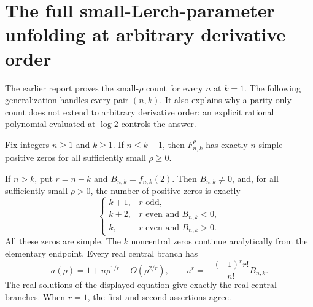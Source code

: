 \section{The full small-Lerch-parameter unfolding at arbitrary derivative order}
\label{unfold:sec:main}

The earlier report \cite{LerchBaseline} proves the small-$\rho$ count for every
$n$ at $k=1$. The following generalization handles every pair $(n,k)$.
It also explains why a parity-only count does not extend to arbitrary
derivative order: an explicit rational polynomial evaluated at $\log2$
controls the answer.

\begin{theorem}
\label{unfold:thm:count}
Fix integers $n\geq1$ and $k\geq1$.
If $n\leq k+1$, then $F_{n,k}^{\rho}$ has exactly $n$ simple
positive zeros for all sufficiently small $\rho\geq0$.

If $n>k$, put $r=n-k$ and $B_{n,k}=f_{n,k}(2)$. Then
$B_{n,k}\ne0$, and, for all sufficiently small $\rho>0$, the
number of positive zeros is exactly
\begin{equation}\label{unfold:eq:counts}
 \begin{cases}
 k+1,&r\text{ odd},\\
 k+2,&r\text{ even and }B_{n,k}<0,\\
 k,&r\text{ even and }B_{n,k}>0.
 \end{cases}
\end{equation}
All these zeros are simple. The $k$ noncentral zeros continue
analytically from the elementary endpoint. Every real central branch
has
\begin{equation}\label{unfold:eq:puiseux}
 a(\rho)=1+u\rho^{1/r}+O(\rho^{2/r}),\qquad
 u^r=-\frac{(-1)^r r!}{n!}B_{n,k}.
\end{equation}
The real solutions of the displayed equation give exactly the real
central branches. When $r=1$, the first and second assertions agree.
\end{theorem}

